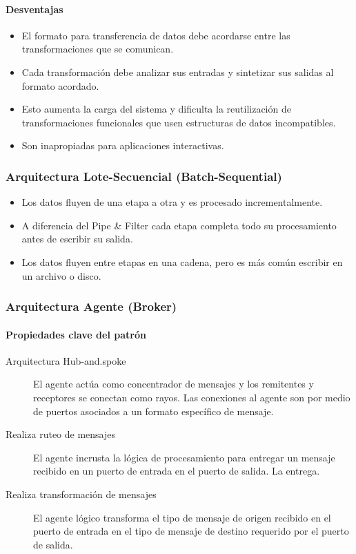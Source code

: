 \paragraph{Desventajas}
\begin{itemize}
	\item El formato para transferencia de datos debe acordarse entre las	transformaciones que se comunican.
	\item Cada transformación debe analizar sus entradas y sintetizar sus salidas al formato acordado.
	\item Esto aumenta la carga del sistema y dificulta la reutilización de transformaciones funcionales que usen estructuras de datos incompatibles.
	\item Son inapropiadas para aplicaciones interactivas.
\end{itemize}
\subsubsection{Arquitectura Lote-Secuencial (Batch-Sequential)}
\begin{itemize}
	\item Los datos fluyen de una etapa a otra y es procesado incrementalmente.
	\item A diferencia del Pipe \& Filter cada etapa completa todo su procesamiento antes de escribir su salida.
	\item Los datos fluyen entre etapas en una cadena, pero es más común escribir en un archivo o disco.
\end{itemize}
\subsubsection{Arquitectura Agente (Broker)}
\paragraph{Propiedades clave del patrón}
\begin{description}
	\item [Arquitectura Hub-and.spoke] El agente actúa como concentrador de mensajes y los remitentes y receptores se conectan como rayos. Las conexiones al agente son por medio de puertos asociados a un formato específico de mensaje.
	\item[Realiza ruteo de mensajes] El agente incrusta la lógica de procesamiento para entregar un mensaje recibido en un puerto de entrada en el puerto de salida. La entrega.
	\item[Realiza transformación de mensajes] El agente lógico transforma el tipo de mensaje de origen recibido en el puerto de entrada en el tipo de mensaje de destino requerido por el puerto de salida.
\end{description}
